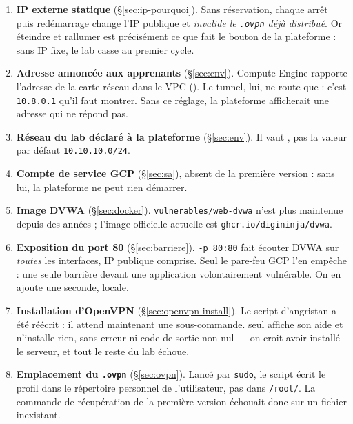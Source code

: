 \documentclass[a4paper,12pt]{article}
\begin{document}
\begin{enumerate}
    \item \textbf{IP externe statique} (§\ref{sec:ip-pourquoi}). Sans réservation, chaque arrêt
          puis redémarrage change l'IP publique et \emph{invalide le
          \texttt{.ovpn} déjà distribué}. Or éteindre et rallumer est
          précisément ce que fait le bouton de la plateforme : sans IP fixe,
          le lab casse au premier cycle.
    \item \textbf{Adresse annoncée aux apprenants} (§\ref{sec:env}). Compute Engine
          rapporte l'adresse de la carte réseau dans le VPC
          (). Le tunnel, lui, ne route que
           : c'est \texttt{10.8.0.1} qu'il faut montrer.
          Sans ce réglage, la plateforme afficherait une adresse qui ne répond
          pas.
    \item \textbf{Réseau du lab déclaré à la plateforme} (§\ref{sec:env}). Il vaut
          , pas la valeur par défaut \texttt{10.10.10.0/24}.
    \item \textbf{Compte de service GCP} (§\ref{sec:sa}), absent de la première
          version : sans lui, la plateforme ne peut rien démarrer.
    \item \textbf{Image DVWA} (§\ref{sec:docker}). \texttt{vulnerables/web-dvwa} n'est plus
          maintenue depuis des années ; l'image officielle actuelle est
          \texttt{ghcr.io/digininja/dvwa}.
    \item \textbf{Exposition du port 80} (§\ref{sec:barriere}). \texttt{-p 80:80} fait écouter
          DVWA sur \emph{toutes} les interfaces, IP publique comprise. Seul le
          pare-feu GCP l'en empêche : une seule barrière devant une application
          volontairement vulnérable. On en ajoute une seconde, locale.
    \item \textbf{Installation d'OpenVPN} (§\ref{sec:openvpn-install}). Le
          script d'angristan a été réécrit : il attend maintenant une
          sous-commande.  seul affiche son aide
          et n'installe rien, sans erreur ni code de sortie non nul --- on croit
          avoir installé le serveur, et tout le reste du lab échoue.
    \item \textbf{Emplacement du \texttt{.ovpn}} (§\ref{sec:ovpn}). Lancé par
          \texttt{sudo}, le script écrit le profil dans le répertoire personnel
          de l'utilisateur, pas dans \texttt{/root/}. La commande de
          récupération de la première version échouait donc sur un fichier
          inexistant.
\end{enumerate}
\end{document}
